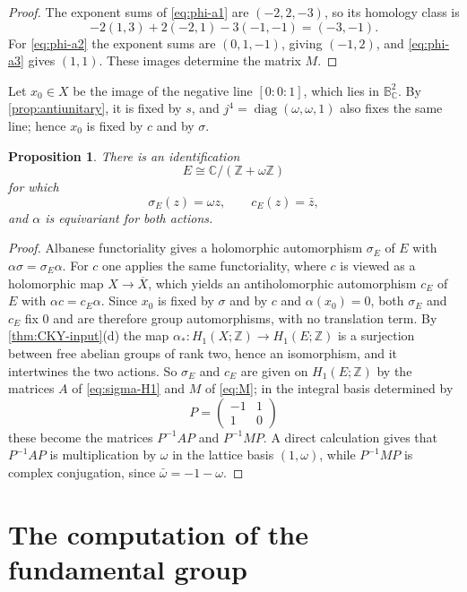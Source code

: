 \documentclass[11pt]{amsart}
\newtheorem{proposition}[theorem]{Proposition}
\theoremstyle{definition}
\theoremstyle{remark}
\newcommand{\Z}{\mathbb Z}
\newcommand{\C}{\mathbb C}
\newcommand{\B}{\mathbb B^2_{\C}}
\newcommand{\omegaE}{\omega}
\begin{document}
\begin{proof}
The exponent sums of \eqref{eq:phi-a1} are $(-2,2,-3)$, so its homology class
is
\[
 -2(1,3)+2(-2,1)-3(-1,-1)=(-3,-1).
\]
For \eqref{eq:phi-a2} the exponent sums are $(0,1,-1)$, giving $(-1,2)$,
and \eqref{eq:phi-a3} gives $(1,1)$.  These images determine the matrix 
$M$.
\end{proof}

Let $x_0\in X$ be the image of the negative line $[0:0:1]$, which lies in
$\B$. By \cref{prop:antiunitary},
it is fixed by $s$, 
and $j^4=\operatorname{diag}(\omegaE,\omegaE,1)$ also fixes the same line;
hence $x_0$ is fixed by $c$ and by $\sigma$.

\begin{proposition}\label{prop:real-Albanese}
There is an identification
\[
 E\cong\C/(\Z+\omegaE\Z)
\]
for which
\[
 \sigma_E(z)=\omegaE z,
 \qquad
 c_E(z)=\bar z,
\]
and $\alpha$ is equivariant for both actions.
\end{proposition}

\begin{proof}
Albanese functoriality gives a holomorphic automorphism $\sigma_E$ of
$E$ with $\alpha\sigma=\sigma_E\alpha$.  For $c$ one applies the same
functoriality, where $c$ is viewed as a holomorphic map $X\to\overline
X$, which yields an antiholomorphic automorphism $c_E$ of $E$ with
$\alpha c=c_E\alpha$.  Since $x_0$ is fixed by $\sigma$ and by $c$ and
$\alpha(x_0)=0$, both $\sigma_E$ and $c_E$ fix $0$ and are therefore
group automorphisms, with no translation term.  By
\cref{thm:CKY-input}\textup{(d)} the map $\alpha_*\colon H_1(X;\Z)\to
H_1(E;\Z)$ is a surjection between free abelian groups of rank two,
hence an isomorphism, and it intertwines the two actions.  So
$\sigma_E$ and $c_E$ are given on $H_1(E;\Z)$ by the matrices $A$ of
\eqref{eq:sigma-H1} and $M$ of \eqref{eq:M}; in the integral basis
determined by
\[
 P=\begin{pmatrix}-1&1\\1&0\end{pmatrix}
\]
these become the matrices $P^{-1}AP$ and $P^{-1}MP$.
A direct calculation gives that $ P^{-1}AP$ is multiplication by
$\omegaE$ in the lattice basis $(1,\omegaE)$, while $ P^{-1}MP$ is
complex conjugation, since $\bar\omegaE=-1-\omegaE$.
\end{proof}

\section{The computation of the fundamental group}
\label{sec:coequalizer}
\end{document}
